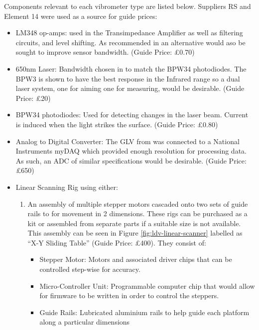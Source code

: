 Components relevant to each vibrometer type are listed below. Suppliers RS and
Element 14 were used as a source for guide prices:

  \begin{itemize}
  \tightlist
  \item
    LM348 op-amps: used in the Transimpedance Amplifier as well as filtering
    circuits, and level shifting. As recommended in \cite{MALAHS2015DESIGNOA} an
    alternative would aso be sought to improve sensor bandwidth. (Guide Price:
    £0.70)
  \item
    650nm Laser: Bandwidth chosen in \cite{MALAHS2015DESIGNOA} to match the
    BPW34 photodiodes. The BPW3 is shown to have the best response in the
    Infrared range so a dual laser system, one for aiming one for measuring,
    would be desirable. (Guide Price: £20)
  \item
    BPW34 photodiodes: Used for detecting changes in the laser beam. Current is
    induced when the light strikes the surface. (Guide Price: £0.80)
  \item
    Analog to Digital Converter: The GLV from \cite{MALAHS2015DESIGNOA} was
    connected to a National Instruments myDAQ which provided enough resolution
    for processing data. As such, an ADC of similar specifications would be
    desirable. (Guide Price: £650)
  \item
    Linear Scanning Rig using either:
    \begin{enumerate}
    \tightlist
    \item
        An assembly of multiple stepper motors cascaded onto two sets of guide
        rails to for movement in 2 dimensions. These rigs can be purchased as a
        kit or assembled from separate parts if a suitable size is not
        available. This assembly can be seen in Figure
        \ref{fig:ldv-linear-scanner} labelled as ``X-Y Sliding Table'' (Guide
        Price: £400). They consist of: 
        \begin{itemize}
        \tightlist
        \item
          Stepper Motor: Motors and associated driver chips that can be
          controlled step-wise for accuracy.
        \item
          Micro-Controller Unit: Programmable computer chip that would allow for
          firmware to be written in order to control the steppers.
        \item
          Guide Rails: Lubricated aluminium rails to help guide each platform
          along a particular dimensions

\end{itemize}
\end{enumerate}
\end{itemize}
